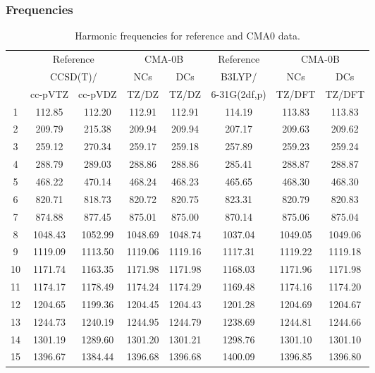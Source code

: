 \documentclass[10pt,oneside]{article}
\begin{document}
\clearpage

\subsubsection*{Frequencies}
\begin{table}[h!]
\centering
\caption{Harmonic frequencies for reference and CMA0 data.}
\begin{tabular}{cccccccc}
\toprule
{} & \multicolumn{2}{c}{Reference} & \multicolumn{2}{c}{CMA-0B} &    Reference & \multicolumn{2}{c}{CMA-0B} \\
{} & \multicolumn{2}{c}{CCSD(T)/} &     NCs &     DCs &       B3LYP/ &     NCs &     DCs \\
{} &   cc-pVTZ & cc-pVDZ &   TZ/DZ &   TZ/DZ & 6-31G(2df,p) &  TZ/DFT &  TZ/DFT \\
\midrule
1  &    112.85 &  112.20 &  112.91 &  112.91 &       114.19 &  113.83 &  113.83 \\
2  &    209.79 &  215.38 &  209.94 &  209.94 &       207.17 &  209.63 &  209.62 \\
3  &    259.12 &  270.34 &  259.17 &  259.18 &       257.89 &  259.23 &  259.24 \\
4  &    288.79 &  289.03 &  288.86 &  288.86 &       285.41 &  288.87 &  288.87 \\
5  &    468.22 &  470.14 &  468.24 &  468.23 &       465.65 &  468.30 &  468.30 \\
6  &    820.71 &  818.73 &  820.72 &  820.75 &       823.31 &  820.79 &  820.83 \\
7  &    874.88 &  877.45 &  875.01 &  875.00 &       870.14 &  875.06 &  875.04 \\
8  &   1048.43 & 1052.99 & 1048.69 & 1048.74 &      1037.04 & 1049.05 & 1049.06 \\
9  &   1119.09 & 1113.50 & 1119.06 & 1119.16 &      1117.31 & 1119.22 & 1119.18 \\
10 &   1171.74 & 1163.35 & 1171.98 & 1171.98 &      1168.03 & 1171.96 & 1171.98 \\
11 &   1174.17 & 1178.49 & 1174.24 & 1174.29 &      1169.48 & 1174.16 & 1174.20 \\
12 &   1204.65 & 1199.36 & 1204.45 & 1204.43 &      1201.28 & 1204.69 & 1204.67 \\
13 &   1244.73 & 1240.19 & 1244.95 & 1244.79 &      1238.69 & 1244.81 & 1244.66 \\
14 &   1301.19 & 1289.60 & 1301.20 & 1301.21 &      1298.76 & 1301.10 & 1301.10 \\
15 &   1396.67 & 1384.44 & 1396.68 & 1396.68 &      1400.09 & 1396.85 & 1396.80 \\

\end{tabular}
\end{table}
\end{document}

